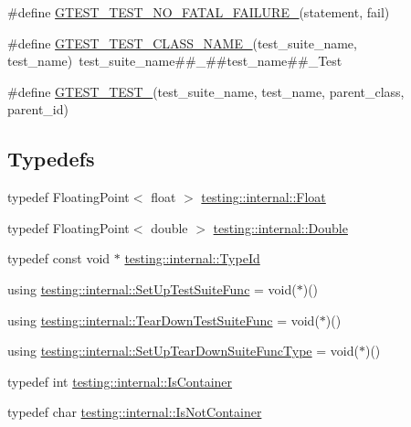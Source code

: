 \begin{DoxyCompactItemize}
\item 
\#define \hyperlink{gtest-internal_8h_a1b37a3c446836d33040f3266a6236081}{G\+T\+E\+S\+T\+\_\+\+T\+E\+S\+T\+\_\+\+N\+O\+\_\+\+F\+A\+T\+A\+L\+\_\+\+F\+A\+I\+L\+U\+R\+E\+\_\+}(statement,  fail)
\item 
\#define \hyperlink{gtest-internal_8h_ad4bc4ec847a06e7de981e81c9bb116cf}{G\+T\+E\+S\+T\+\_\+\+T\+E\+S\+T\+\_\+\+C\+L\+A\+S\+S\+\_\+\+N\+A\+M\+E\+\_\+}(test\+\_\+suite\+\_\+name,  test\+\_\+name)~test\+\_\+suite\+\_\+name\#\#\+\_\+\#\#test\+\_\+name\#\#\+\_\+\+Test
\item 
\#define \hyperlink{gtest-internal_8h_ab43103f7842de04474e362689f782a46}{G\+T\+E\+S\+T\+\_\+\+T\+E\+S\+T\+\_\+}(test\+\_\+suite\+\_\+name,  test\+\_\+name,  parent\+\_\+class,  parent\+\_\+id)
\end{DoxyCompactItemize}
\subsection*{Typedefs}
\begin{DoxyCompactItemize}
\item 
typedef Floating\+Point$<$ float $>$ \hyperlink{namespacetesting_1_1internal_a02e1981f5ff70609e6ac06e006ff519a}{testing\+::internal\+::\+Float}
\item 
typedef Floating\+Point$<$ double $>$ \hyperlink{namespacetesting_1_1internal_a66a7579b1893b260c31dad577f7a5c48}{testing\+::internal\+::\+Double}
\item 
typedef const void $\ast$ \hyperlink{namespacetesting_1_1internal_ab1114197d3c657d8b7f8e0c5caa12d00}{testing\+::internal\+::\+Type\+Id}
\item 
using \hyperlink{namespacetesting_1_1internal_a83e4e0732ac6a9dcfe6ee299dc1b9fa2}{testing\+::internal\+::\+Set\+Up\+Test\+Suite\+Func} = void($\ast$)()
\item 
using \hyperlink{namespacetesting_1_1internal_a8257a87aa42cebaa54b0c48a6ae657a5}{testing\+::internal\+::\+Tear\+Down\+Test\+Suite\+Func} = void($\ast$)()
\item 
using \hyperlink{namespacetesting_1_1internal_a04786aa10f8b0bf38a5ead94d00475f4}{testing\+::internal\+::\+Set\+Up\+Tear\+Down\+Suite\+Func\+Type} = void($\ast$)()
\item 
typedef int \hyperlink{namespacetesting_1_1internal_ad8f0c2883245f1df2a53618a49f0deb3}{testing\+::internal\+::\+Is\+Container}
\item 
typedef char \hyperlink{namespacetesting_1_1internal_abf080521ce135deb510e0a7830fd3d33}{testing\+::internal\+::\+Is\+Not\+Container}
\end{DoxyCompactItemize}
